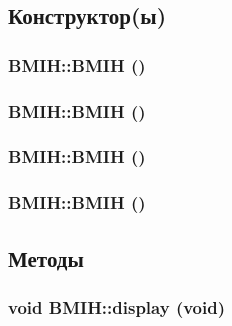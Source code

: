 \subsection{Конструктор(ы)}
\hypertarget{class_b_m_i_h_f16a14a7fe56a28349067fe18858f9f3}{
\subsubsection[{BMIH}]{\setlength{\rightskip}{0pt plus 5cm}BMIH::BMIH ()}}
\label{class_b_m_i_h_f16a14a7fe56a28349067fe18858f9f3}


\hypertarget{class_b_m_i_h_f16a14a7fe56a28349067fe18858f9f3}{
\subsubsection[{BMIH}]{\setlength{\rightskip}{0pt plus 5cm}BMIH::BMIH ()}}
\label{class_b_m_i_h_f16a14a7fe56a28349067fe18858f9f3}


\hypertarget{class_b_m_i_h_f16a14a7fe56a28349067fe18858f9f3}{
\subsubsection[{BMIH}]{\setlength{\rightskip}{0pt plus 5cm}BMIH::BMIH ()}}
\label{class_b_m_i_h_f16a14a7fe56a28349067fe18858f9f3}


\hypertarget{class_b_m_i_h_f16a14a7fe56a28349067fe18858f9f3}{
\subsubsection[{BMIH}]{\setlength{\rightskip}{0pt plus 5cm}BMIH::BMIH ()}}
\label{class_b_m_i_h_f16a14a7fe56a28349067fe18858f9f3}




\subsection{Методы}
\hypertarget{class_b_m_i_h_3204317506996229b6fefaacbb2d79cb}{
\subsubsection[{display}]{\setlength{\rightskip}{0pt plus 5cm}void BMIH::display (void)}}
\label{class_b_m_i_h_3204317506996229b6fefaacbb2d79cb}


